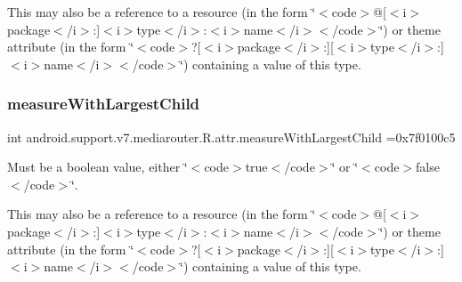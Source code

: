 This may also be a reference to a resource (in the form \char`\"{}$<$code$>$@\mbox{[}$<$i$>$package$<$/i$>$\+:\mbox{]}$<$i$>$type$<$/i$>$\+:$<$i$>$name$<$/i$>$$<$/code$>$\char`\"{}) or theme attribute (in the form \char`\"{}$<$code$>$?\mbox{[}$<$i$>$package$<$/i$>$\+:\mbox{]}\mbox{[}$<$i$>$type$<$/i$>$\+:\mbox{]}$<$i$>$name$<$/i$>$$<$/code$>$\char`\"{}) containing a value of this type. \mbox{\label{classandroid_1_1support_1_1v7_1_1mediarouter_1_1R_1_1attr_a899ba0652d7456262ca0278dcd856b28}} 
\subsubsection{\texorpdfstring{measure\+With\+Largest\+Child}{measureWithLargestChild}}
{\footnotesize\ttfamily int android.\+support.\+v7.\+mediarouter.\+R.\+attr.\+measure\+With\+Largest\+Child =0x7f0100c5\hspace{0.3cm}{\ttfamily [static]}}

Must be a boolean value, either \char`\"{}$<$code$>$true$<$/code$>$\char`\"{} or \char`\"{}$<$code$>$false$<$/code$>$\char`\"{}. 

This may also be a reference to a resource (in the form \char`\"{}$<$code$>$@\mbox{[}$<$i$>$package$<$/i$>$\+:\mbox{]}$<$i$>$type$<$/i$>$\+:$<$i$>$name$<$/i$>$$<$/code$>$\char`\"{}) or theme attribute (in the form \char`\"{}$<$code$>$?\mbox{[}$<$i$>$package$<$/i$>$\+:\mbox{]}\mbox{[}$<$i$>$type$<$/i$>$\+:\mbox{]}$<$i$>$name$<$/i$>$$<$/code$>$\char`\"{}) containing a value of this type. \mbox{\label{classandroid_1_1support_1_1v7_1_1mediarouter_1_1R_1_1attr_a45bbd2aa62503aa1460bf68357fc3377}} 
